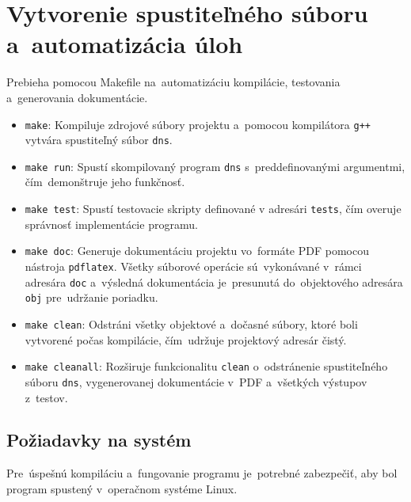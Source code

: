 \documentclass[a4paper, 11pt]{article}
\begin{document}
	\section{Vytvorenie spustiteľného súboru a~automatizácia úloh}
	Prebieha pomocou Makefile na~automatizáciu kompilácie, testovania a~generovania dokumentácie. 
	\begin{itemize}
		\item \texttt{make}: Kompiluje zdrojové súbory projektu a~pomocou kompilátora \texttt{g++} vytvára spustiteľný súbor \texttt{dns}.
		\item \texttt{make run}: Spustí skompilovaný program \texttt{dns} s~preddefinovanými argumentmi, čím~demonštruje jeho funkčnosť.
		\item \texttt{make test}: Spustí testovacie skripty definované v adresári \texttt{tests}, čím overuje správnosť implementácie programu.
		\item \texttt{make doc}: Generuje dokumentáciu projektu vo~formáte PDF pomocou nástroja \texttt{pdflatex}. Všetky súborové operácie sú~vykonávané v~rámci adresára \texttt{doc} a~výsledná dokumentácia je~presunutá do~objektového adresára \texttt{obj} pre~udržanie poriadku.
		\item \texttt{make clean}: Odstráni všetky objektové a~dočasné súbory, ktoré boli vytvorené počas kompilácie, čím~udržuje projektový adresár čistý.
		\item \texttt{make cleanall}: Rozširuje funkcionalitu \texttt{clean} o~odstránenie spustiteľného súboru \texttt{dns}, vygenerovanej dokumentácie v~PDF a~všetkých výstupov z~testov.
	\end{itemize}
	\subsection{Požiadavky na systém}
	Pre~úspešnú kompiláciu a~fungovanie programu je~potrebné zabezpečiť, aby bol program spustený v~operačnom systéme Linux.
	
\end{document}
